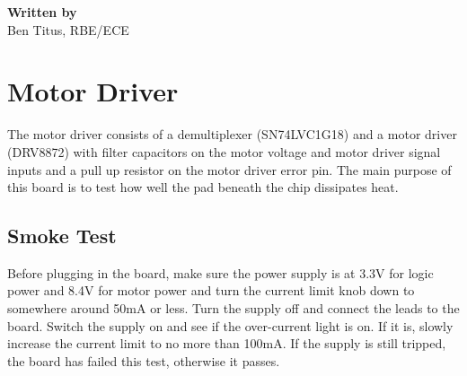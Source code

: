 \documentclass[12pt,letterpaper]{article}
\begin{document}
	\begin{titlepage}
		\begin{center}
			\begin{minipage}{\textwidth}
				\vspace{2cm}
			\end{minipage}
			\vfill
			\vfill
			
			\LARGE
			\textbf{Written by} \\
			\Large
			Ben Titus, RBE/ECE \\			
			\vfill
		\end{center}
	\end{titlepage}
	
	\newpage
	\tableofcontents
	\newpage
	
	\section{Motor Driver}
	The motor driver consists of a demultiplexer (SN74LVC1G18) and a motor driver (DRV8872) with filter capacitors on the motor voltage and motor driver signal inputs and a pull up resistor on the motor driver error pin. The main purpose of this board is to test how well the pad beneath the chip dissipates heat.
	
	\subsection{Smoke Test}
	Before plugging in the board, make sure the power supply is at 3.3V for logic power and 8.4V for motor power and turn the current limit knob down to somewhere around 50mA or less. Turn the supply off and connect the leads to the board. Switch the supply on and see if the over-current light is on. If it is, slowly increase the current limit to no more than 100mA. If the supply is still tripped, the board has failed this test, otherwise it passes.
	
\end{document}
